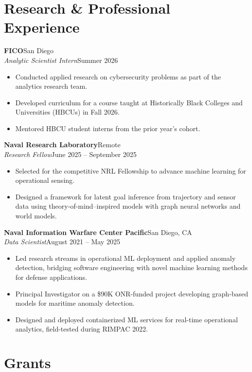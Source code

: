 \documentclass[11pt,letterpaper]{article}
\newcommand{\entry}[4]{%
  \textbf{#1}\hfill #2\\
  \textit{#3}\hfill #4\par}
\begin{document}
\section{Research \& Professional Experience}

\entry{FICO}{San Diego}{Analytic Scientist Intern}{Summer 2026}
\begin{itemize}
  \item Conducted applied research on cybersecurity problems as part of the analytics research team.
  \item Developed curriculum for a course taught at Historically Black Colleges and Universities (HBCUs) in Fall 2026.
  \item Mentored HBCU student interns from the prior year's cohort.
\end{itemize}
\vspace{0.5em}

\entry{Naval Research Laboratory}{Remote}{Research Fellow}{June 2025 – September 2025}
\begin{itemize}
  \item Selected for the competitive NRL Fellowship to advance machine learning for operational sensing.
  \item Designed a framework for latent goal inference from trajectory and sensor data using theory-of-mind–inspired models with graph neural networks and world models.
\end{itemize}
\vspace{0.5em}

\entry{Naval Information Warfare Center Pacific}{San Diego, CA}{Data Scientist}{August 2021 – May 2025}
\begin{itemize}
  \item Led research streams in operational ML deployment and applied anomaly detection, bridging software engineering with novel machine learning methods for defense applications.
  \item Principal Investigator on a \$90K ONR-funded project developing graph-based models for maritime anomaly detection.
  \item Designed and deployed containerized ML services for real-time operational analytics, field-tested during RIMPAC 2022.
\end{itemize}

\section{Grants}
\end{document}
